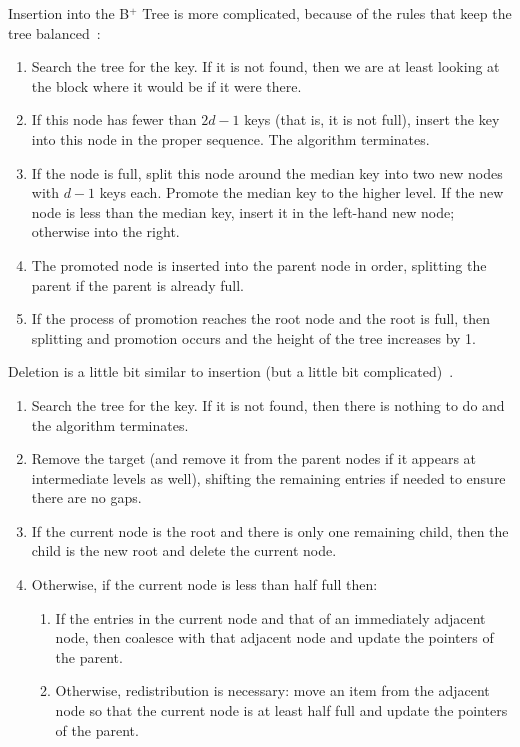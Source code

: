 Insertion into the B$^{+}$ Tree is more complicated, because of the rules that keep the tree balanced~\cite{osi}:

\begin{enumerate}
	\item Search the tree for the key. If it is not found, then we are at least looking at the block where it would be if it were there.
	\item If this node has fewer than $2d-1$ keys (that is, it is not full), insert the key into this node in the proper sequence. The algorithm terminates.
	\item If the node is full, split this node around the median key into two new nodes with $d-1$ keys each. Promote the median key to the higher level. If the new node is less than the median key, insert it in the left-hand new node; otherwise into the right.
	\item The promoted node is inserted into the parent node in order, splitting the parent if the parent is already full.
	\item If the process of promotion reaches the root node and the root is full, then splitting and promotion occurs and the height of the tree increases by 1.
\end{enumerate}


Deletion is a little bit similar to insertion (but a little bit complicated)~\cite{dsc}. 

\begin{enumerate}
	\item Search the tree for the key. If it is not found, then there is nothing to do and the algorithm terminates.
	\item Remove the target (and remove it from the parent nodes if it appears at intermediate levels as well), shifting the remaining entries if needed to ensure there are no gaps.
	\item If the current node is the root and there is only one remaining child, then the child is the new root and delete the current node.
	\item Otherwise, if the current node is less than half full then:
		\begin{enumerate}
			\item If the entries in the current node and that of an immediately adjacent node, then coalesce with that adjacent node and update the pointers of the parent.
			\item Otherwise, redistribution is necessary: move an item from the adjacent node so that the current node is at least half full and update the pointers of the parent.
		\end{enumerate}
\end{enumerate}

